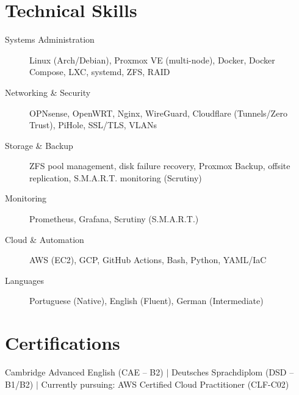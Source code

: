\documentclass[10pt]{article}
\begin{document}
\section{Technical Skills}
\begin{description}
	\item[Systems Administration] Linux (Arch/Debian), Proxmox VE (multi-node), Docker, Docker Compose, LXC, systemd, ZFS, RAID
	\item[Networking \& Security] OPNsense, OpenWRT, Nginx, WireGuard, Cloudflare (Tunnels/Zero Trust), PiHole, SSL/TLS, VLANs
	\item[Storage \& Backup] ZFS pool management, disk failure recovery, Proxmox Backup, offsite replication, S.M.A.R.T. monitoring (Scrutiny)
	\item[Monitoring] Prometheus, Grafana, Scrutiny (S.M.A.R.T.)
	\item[Cloud \& Automation] AWS (EC2), GCP, GitHub Actions, Bash, Python, YAML/IaC
	\item[Languages] Portuguese (Native), English (Fluent), German (Intermediate)
\end{description}

\section{Certifications}
Cambridge Advanced English (CAE -- B2) $|$ Deutsches Sprachdiplom (DSD -- B1/B2) $|$ Currently pursuing: AWS Certified Cloud Practitioner (CLF-C02)
\end{document}
